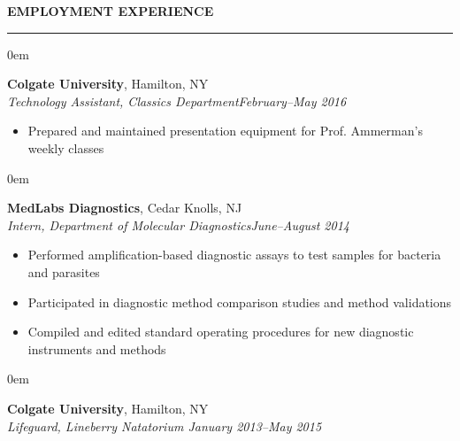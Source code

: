 \documentclass[10pt, letterpaper]{article} %
\newenvironment{CVSection}{
\begin{addmargin}[2em]{0em}
\begin{samepage}}
{\end{samepage}
\end{addmargin}\bigskip}
\newcommand{\CVHeading}[1]{
\MakeUppercase{\bf #1}
\smallskip
\hrule
\medskip
}
\begin{document}
\CVHeading{Employment Experience}
\begin{CVSection}
\textbf{Colgate University}, Hamilton, NY\\
\textsl{Technology Assistant, Classics Department\hfill  February--May 2016}
\begin{itemize}
\item Prepared and maintained presentation equipment for Prof. Ammerman’s weekly classes
\end{itemize}
\end{CVSection}
\begin{CVSection}
\textbf{MedLabs Diagnostics}, Cedar Knolls, NJ\\
\textsl{Intern, Department of Molecular Diagnostics\hfill June--August 2014}
\begin{itemize}
\item Performed amplification-based diagnostic assays to test samples for bacteria and parasites
\item Participated in diagnostic method comparison studies and method validations
\item Compiled and edited standard operating procedures for new diagnostic instruments and methods
\end{itemize}
\end{CVSection}
\begin{CVSection}
\textbf{Colgate University}, Hamilton, NY\\
\textsl{Lifeguard, Lineberry Natatorium \hfill January 2013--May 2015}
\end{CVSection}
\end{document}
